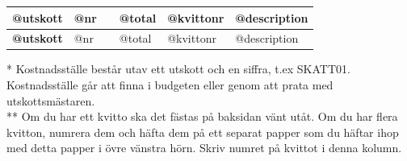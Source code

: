 \documentclass{article}
\begin{document}
\begin{tabular}{|p{0.8in}|p{0.3in}|p{1.2in}|p{0.7in}|p{0.5in}|p{2.3in}|}
    {\footnotesize \qquad} \newline \textbf{\qquad @utskott} & \qquad \newline @nr & \qquad & \qquad \newline @total & \qquad \newline @kvittonr & \qquad \newline @description \\ \hline
    {\footnotesize \qquad} \newline \textbf{\qquad @utskott} & \qquad \newline @nr & \qquad & \qquad \newline @total & \qquad \newline @kvittonr & \qquad \newline @description \\ \hline
\end{tabular}

\vspace{1em}
\noindent
* Kostnadsställe består utav ett utskott och en siffra, t.ex SKATT01. Kostnadsställe går att finna i budgeten eller genom att prata med utskottsmästaren.\\
\noindent
** Om du har ett kvitto ska det fästas på baksidan vänt utåt. Om du har flera kvitton, numrera dem och häfta dem på ett separat papper som du häftar ihop med detta papper i övre vänstra hörn. Skriv numret på kvittot i denna kolumn.
\end{document}
